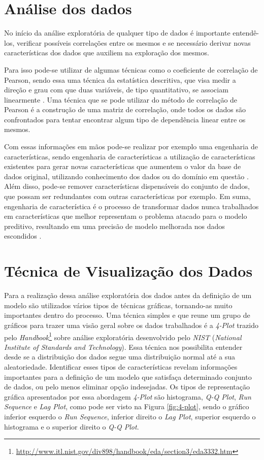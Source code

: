 \section{Análise dos dados}

No início da análise exploratória de qualquer tipo de dados é importante
entendê-los, verificar possíveis correlações entre os mesmos e se necessário
derivar novas características dos dados que auxiliem na exploração dos mesmos.

Para isso pode-se utilizar de algumas técnicas como o coeficiente de correlação
de Pearson, sendo essa uma técnica da estatística descritiva, que visa medir a
direção e grau com que duas variáveis, de tipo quantitativo, se associam
linearmente \cite{rossman:1996}. Uma técnica que se pode utilizar do método de
correlação de Pearson é a construção de uma matriz de correlação, onde todos os
dados são confrontados para tentar encontrar algum tipo de dependência linear
entre os mesmos. 

Com essas informações em mãos pode-se realizar por exemplo uma engenharia de
características, sendo engenharia de características a utilização de
características existentes para gerar novas características que aumentem o valor
da base de dados original, utilizando conhecimento dos dados ou do domínio em
questão \cite{brink:2014}. Além disso, pode-se remover características
dispensáveis do conjunto de dados, que possam ser redundantes com outras
características por exemplo. Em suma, engenharia de característica é o processo
de transformar dados nunca trabalhados em características que melhor representam
o problema atacado para o modelo preditivo, resultando em uma precisão de modelo
melhorada nos dados escondidos \cite{brownlee:2014}.

\section{Técnica de Visualização dos Dados}\label{4-plot}

Para a realização dessa análise exploratória dos dados antes da definição de um
modelo são utilizados vários tipos de técnicas gráficas, tornando-as muito
importantes dentro do processo. Uma técnica simples e que reune um grupo de
gráficos para trazer uma visão geral sobre os dados trabalhados é a
\textit{4-Plot} trazido pelo
\textit{Handbook}\footnote{\url{http://www.itl.nist.gov/div898/handbook/eda/section3/eda3332.htm}}
sobre análise exploratória desenvolvido pelo \textit{NIST} (\textit{National
Institute of Standards and Technology}). Essa técnica nos possibilita entender
desde se a distribuição dos dados segue uma distribuição normal até a sua
aleatoriedade. Identificar esses tipos de características revelam informações
importantes para a definição de um modelo que satisfaça determinado conjunto de
dados, ou pelo menos eliminar opção indesejadas. Os tipos de representação gráfica
apresentados por essa abordagem \textit{4-Plot} são histograma, \textit{Q-Q
Plot}, \textit{Run Sequence} e \textit{Lag Plot}, como pode ser visto na Figura
\ref{fig:4-plot}, sendo o gráfico inferior esquerdo o \textit{Run Sequence},
inferior direito o \textit{Lag Plot}, superior esquerdo o histograma e o
superior direito o \textit{Q-Q Plot}.

